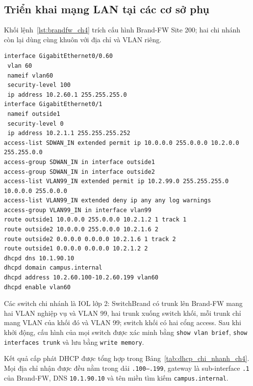 \subsection{Triển khai mạng LAN tại các cơ sở phụ}

Khối lệnh~\ref{lst:brandfw_ch4} trích cấu hình Brand-FW Site 200; hai chi nhánh còn lại dùng cùng khuôn với địa chỉ và VLAN riêng.

\begin{lstlisting}[style=customcode,caption={Trích cấu hình Brand-FW Site 200},label={lst:brandfw_ch4}]
interface GigabitEthernet0/0.60
 vlan 60
 nameif vlan60
 security-level 100
 ip address 10.2.60.1 255.255.255.0
interface GigabitEthernet0/1
 nameif outside1
 security-level 0
 ip address 10.2.1.1 255.255.255.252
access-list SDWAN_IN extended permit ip 10.0.0.0 255.0.0.0 10.2.0.0 255.255.0.0
access-group SDWAN_IN in interface outside1
access-group SDWAN_IN in interface outside2
access-list VLAN99_IN extended permit ip 10.2.99.0 255.255.255.0 10.0.0.0 255.0.0.0
access-list VLAN99_IN extended deny ip any any log warnings
access-group VLAN99_IN in interface vlan99
route outside1 10.0.0.0 255.0.0.0 10.2.1.2 1 track 1
route outside2 10.0.0.0 255.0.0.0 10.2.1.6 2
route outside2 0.0.0.0 0.0.0.0 10.2.1.6 1 track 2
route outside1 0.0.0.0 0.0.0.0 10.2.1.2 2
dhcpd dns 10.1.90.10
dhcpd domain campus.internal
dhcpd address 10.2.60.100-10.2.60.199 vlan60
dhcpd enable vlan60
\end{lstlisting}

Các switch chi nhánh là IOL lớp 2: SwitchBrand có trunk lên Brand-FW mang hai VLAN nghiệp vụ và VLAN 99, hai trunk xuống switch khối, mỗi trunk chỉ mang VLAN của khối đó và VLAN 99; switch khối có hai cổng access. Sau khi khởi động, cấu hình của mọi switch được xác minh bằng \texttt{show vlan brief}, \texttt{show interfaces trunk} và lưu bằng \texttt{write memory}.

Kết quả cấp phát DHCP được tổng hợp trong Bảng~\ref{tab:dhcp_chi_nhanh_ch4}. Mọi địa chỉ nhận được đều nằm trong dải \texttt{.100--.199}, gateway là sub-interface \texttt{.1} của Brand-FW, DNS \texttt{10.1.90.10} và tên miền tìm kiếm \texttt{campus.internal}.

